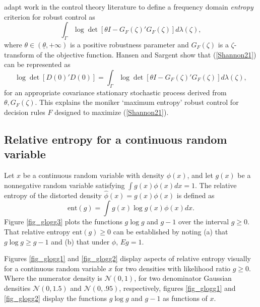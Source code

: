 \begin{subappendices}
\citet[ch.~8]{HSrobustnessmonograph} adapt work in the control theory literature to define a
frequency domain {\em entropy} criterion for  robust control as
\begin{equation}\label{Shannon21}
\int_\Gamma \log \det [ \theta I - G_F(\zeta)' G_F(\zeta) ] d \lambda(\zeta) ,
\end{equation}
where $\theta \in (\underline \theta, +\infty)$ is a positive robustness parameter and $G_F(\zeta)$ is a $\zeta$-transform of the
objective function.  Hansen and Sargent show that (\ref{Shannon21}) can be represented as
\begin{equation}\label{Shannon22}
\log \det [ D(0)' D(0)] = \int_\Gamma \log \det [ \theta I - G_F(\zeta)' G_F(\zeta) ] d \lambda(\zeta) ,
\end{equation}
for an appropriate covariance stationary stochastic process derived from $\theta, G_F(\zeta)$. This explains the
moniker `maximum entropy' robust control for decision rules $F$ designed to maximize (\ref{Shannon21}).




\subsection{Relative entropy for a continuous random variable\label{sec:entropynonneg}}

Let $x$ be  a continuous random variable with density $\phi(x)$, and let $g(x) $ be a nonnegative random variable satisfying $\int g(x) \phi(x) dx =1$.
The relative entropy of the distorted density $\hat \phi(x) = g(x) \phi(x)$  is defined
as
\[ \textrm{ent}(g) = \int g(x) \log g(x) \phi(x) d x .\]
Figure \ref{fig_glogg3} plots the functions $g \log g$ and $g -1$
over the interval $g \geq 0$.   That relative entropy $\textrm{ent}(g) \geq 0$ can be established by noting (a) that  $g \log g \geq g-1$ %
 and (b) that under $\phi$, $E g =1$.

Figures \ref{fig_glogg1} and \ref{fig_glogg2} display aspects of relative entropy visually for a continuous random variable $x$ for
two densities with likelihood ratio $g \geq 0$.  Where the numerator density is ${\mathcal N}(0,1)$, for two denominator  Gaussian densities ${\mathcal N}(0,1.5)$ and ${\mathcal N}(0,.95)$, respectively, figures
\ref{fig_glogg1} and \ref{fig_glogg2} display the functions  $g \log g$ and $g -1$ as functions of $x$.  %



\end{subappendices}
